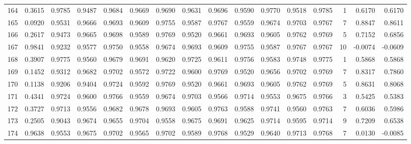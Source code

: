 \begin{tabular}{lrrrrrrrrrrrrrrr}
164 &      0.3615 &  0.9785 &  0.9487 &  0.9684 &  0.9669 &  0.9690 &  0.9631 &  0.9696 &  0.9590 &  0.9770 &   0.9518 &     0.9785 &      1 &                    0.6170 &                     0.6170 \\
165 &      0.0920 &  0.9531 &  0.9666 &  0.9693 &  0.9609 &  0.9755 &  0.9587 &  0.9767 &  0.9559 &  0.9674 &   0.9703 &     0.9767 &      7 &                    0.8847 &                     0.8611 \\
166 &      0.2617 &  0.9473 &  0.9665 &  0.9698 &  0.9589 &  0.9769 &  0.9520 &  0.9661 &  0.9693 &  0.9605 &   0.9762 &     0.9769 &      5 &                    0.7152 &                     0.6856 \\
167 &      0.9841 &  0.9232 &  0.9577 &  0.9750 &  0.9558 &  0.9674 &  0.9693 &  0.9609 &  0.9755 &  0.9587 &   0.9767 &     0.9767 &     10 &                   -0.0074 &                    -0.0609 \\
168 &      0.3907 &  0.9775 &  0.9560 &  0.9679 &  0.9691 &  0.9620 &  0.9725 &  0.9611 &  0.9756 &  0.9583 &   0.9748 &     0.9775 &      1 &                    0.5868 &                     0.5868 \\
169 &      0.1452 &  0.9312 &  0.9682 &  0.9702 &  0.9572 &  0.9722 &  0.9600 &  0.9769 &  0.9520 &  0.9656 &   0.9702 &     0.9769 &      7 &                    0.8317 &                     0.7860 \\
170 &      0.1138 &  0.9206 &  0.9404 &  0.9724 &  0.9592 &  0.9769 &  0.9520 &  0.9661 &  0.9693 &  0.9605 &   0.9762 &     0.9769 &      5 &                    0.8631 &                     0.8068 \\
171 &      0.4341 &  0.9724 &  0.9600 &  0.9766 &  0.9559 &  0.9674 &  0.9703 &  0.9566 &  0.9714 &  0.9553 &   0.9675 &     0.9766 &      3 &                    0.5425 &                     0.5383 \\
172 &      0.3727 &  0.9713 &  0.9556 &  0.9682 &  0.9678 &  0.9693 &  0.9605 &  0.9763 &  0.9588 &  0.9741 &   0.9560 &     0.9763 &      7 &                    0.6036 &                     0.5986 \\
173 &      0.2505 &  0.9043 &  0.9674 &  0.9655 &  0.9704 &  0.9558 &  0.9675 &  0.9691 &  0.9625 &  0.9714 &   0.9595 &     0.9714 &      9 &                    0.7209 &                     0.6538 \\
174 &      0.9638 &  0.9553 &  0.9675 &  0.9702 &  0.9565 &  0.9702 &  0.9589 &  0.9768 &  0.9529 &  0.9640 &   0.9713 &     0.9768 &      7 &                    0.0130 &                    -0.0085 \\

\end{tabular}
